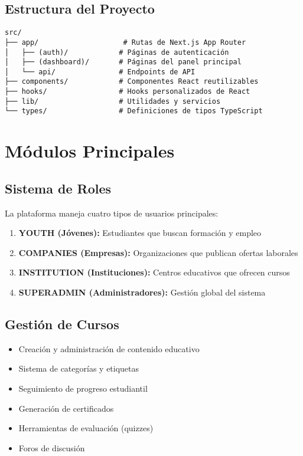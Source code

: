 \documentclass[12pt,a4paper]{article}
\begin{document}
\subsection{Estructura del Proyecto}

\begin{verbatim}
src/
├── app/                    # Rutas de Next.js App Router
│   ├── (auth)/            # Páginas de autenticación
│   ├── (dashboard)/       # Páginas del panel principal
│   └── api/               # Endpoints de API
├── components/            # Componentes React reutilizables
├── hooks/                 # Hooks personalizados de React
├── lib/                   # Utilidades y servicios
└── types/                 # Definiciones de tipos TypeScript
\end{verbatim}

\section{Módulos Principales}

\subsection{Sistema de Roles}

La plataforma maneja cuatro tipos de usuarios principales:

\begin{enumerate}
    \item \textbf{YOUTH (Jóvenes):} Estudiantes que buscan formación y empleo
    \item \textbf{COMPANIES (Empresas):} Organizaciones que publican ofertas laborales
    \item \textbf{INSTITUTION (Instituciones):} Centros educativos que ofrecen cursos
    \item \textbf{SUPERADMIN (Administradores):} Gestión global del sistema
\end{enumerate}

\subsection{Gestión de Cursos}

\begin{itemize}
    \item Creación y administración de contenido educativo
    \item Sistema de categorías y etiquetas
    \item Seguimiento de progreso estudiantil
    \item Generación de certificados
    \item Herramientas de evaluación (quizzes)
    \item Foros de discusión
\end{itemize}
\end{document}
